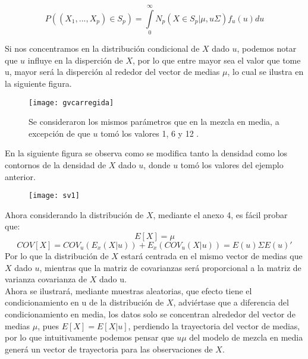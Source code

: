 \documentclass[11pt]{book}
\begin{document}
\begin{equation}
P((X_{1},...,X_{p})\in S_{p})=\underset{0}{\overset{\infty }{\int }}N_{p}(X\in S_{p}|\mu,u\Sigma)f_{u}(u)du 
\end{equation}

Si nos concentramos en la distribución condicional de $X$ dado $u$, podemos notar que $u$ influye en la disperción de $X$, por lo que entre mayor sea el valor que tome u, mayor será la disperción al rededor del vector de medias $\mu$, lo cual se ilustra en la siguiente figura. 

\begin{figure}[h]
\centering
\texttt{[image: gvcarregida]}
\caption{Se consideraron los mismos parámetros que en la mezcla en media, a excepción de que $u$ tomó los valores 1, 6 y 12 .}
\end{figure}

En la siguiente figura se observa como se modifica tanto la densidad como los contornos de la densidad de $X$ dado $u$, donde $u$ tomó los valores del ejemplo anterior.\\

\pagebreak

\begin{figure}
\centering
\texttt{[image: sv1]}
\end{figure}

Ahora considerando la distribución de $X$, mediante el anexo 4, es fácil probar que: 
\begin{equation*}
E[X]=\mu
\end{equation*}
\begin{equation*}
COV[X]=COV_{u}(E_{x}(X|u)) + E_{x}(COV_{u}(X|u))=E(u)\Sigma E(u)'
\end{equation*}
  Por lo que la distribución de $X$ estará centrada en el mismo vector de medias que $X$ dado $u$, mientras que la matriz de covarianzas será proporcional a la matriz de varianza covarianza de $X$ dado u.\\

Ahora se ilustrará, mediante muestras aleatorias, que efecto tiene el condicionamiento en u de la distribución de $X$, adviértase que a diferencia del condicionamiento en media, los datos solo se concentran alrededor del vector de medias $\mu$, pues $E[X]=E[X|u]$, perdiendo la trayectoria del vector de medias, por lo que intuitivamente podemos pensar que $u\mu$ del modelo de mezcla en media generá un vector de trayectoria para las observaciones de $X$.\\
\end{document}
